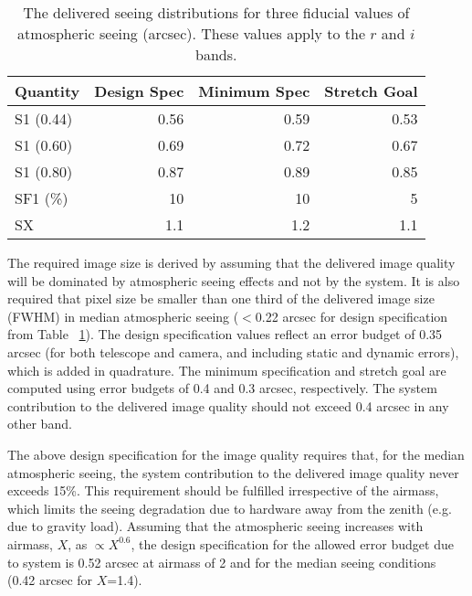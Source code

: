 \begin{table}[h]
\begin{tabular}{|l|r|r|r|}
\hline
        Quantity  &  Design Spec & Minimum Spec & Stretch Goal \\
\hline
       S1 (0.44)  &    0.56      &     0.59      &     0.53      \\
       S1 (0.60)  &    0.69      &     0.72      &     0.67      \\
       S1 (0.80)  &    0.87      &     0.89      &     0.85      \\
       SF1 (\%)   &    10        &      10       &       5       \\
          SX      &    1.1       &     1.2       &     1.1       \\
\hline
\end{tabular}
\caption{The delivered seeing distributions for three fiducial values
of atmospheric seeing (arcsec). These values apply to the $r$ and
$i$ bands.}
\label{seeingT}
\end{table}

The required image size is derived by assuming that the delivered image
quality will be dominated by atmospheric seeing effects and not by the
system. It is also required that pixel size be smaller than one third
of the delivered image size (FWHM) in median atmospheric seeing
($<$0.22 arcsec for design specification from Table ~\ref{seeingT}).
The design specification values reflect an error budget of 0.35
arcsec (for both telescope and camera, and including static and dynamic
errors), which is added in quadrature. The minimum specification and
stretch goal are computed using error budgets of 0.4 and 0.3 arcsec,
respectively. The system contribution to the delivered
image quality should not exceed 0.4 arcsec in any other band.

The above design specification for the image quality
requires that, for the median atmospheric seeing, the system
contribution to the delivered image quality never exceeds 15\%.
This requirement should be fulfilled irrespective of the airmass,
which limits the seeing degradation due to hardware away from the
zenith (e.g. due to gravity load). Assuming that the atmospheric seeing
increases with airmass, $X$, as $\propto X^{0.6}$, the design
specification for the allowed error budget due to system is
0.52 arcsec at airmass of 2 and for the median seeing
conditions (0.42 arcsec for $X$=1.4).




\vskip 0.2in 

